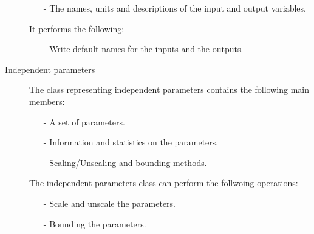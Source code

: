 \begin{description}
\begin{itemize}
\item[-] The names, units and descriptions of the input and output variables.
\end{itemize}

It performs the following:

\begin{itemize}
\item[-] Write default names for the inputs and the outputs. 
\end{itemize}

\item[Independent parameters] The class representing independent parameters contains the following main members:

\begin{itemize}
\item[-] A set of parameters.
\item[-] Information and statistics on the parameters.
\item[-] Scaling/Unscaling and bounding methods. 
\end{itemize}

The independent parameters class can perform the follwoing operations:

\begin{itemize}
\item[-] Scale and unscale the parameters.
\item[-] Bounding the parameters. 
\end{itemize}

\end{description}



